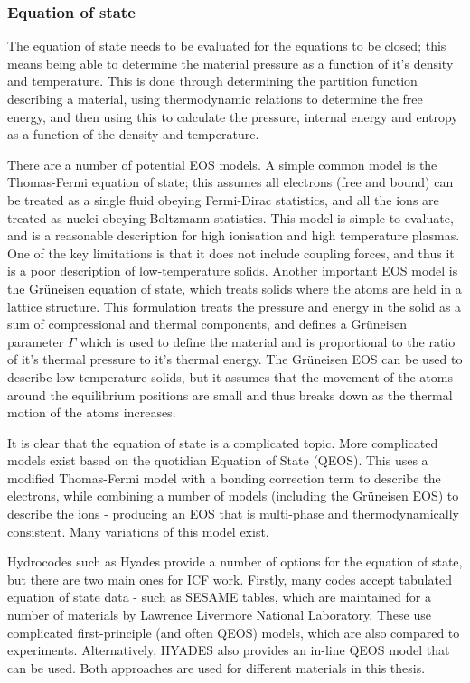 \subsubsection{Equation of state}
The equation of state needs to be evaluated for the equations to be closed; this means being able to determine the material pressure as a function of it's density and temperature. This is done through determining the partition function describing a material, using thermodynamic relations to determine the free energy, and then using this to calculate the pressure, internal energy and entropy as a function of the density and temperature.

There are a number of potential EOS models. A simple common model is the Thomas-Fermi equation of state; this assumes all electrons (free and bound) can be treated as a single fluid obeying Fermi-Dirac statistics, and all the ions are treated as nuclei obeying Boltzmann statistics. This model is simple to evaluate, and is a reasonable description for high ionisation and high temperature plasmas. One of the key limitations is that it does not include coupling forces, and thus it is a poor description of low-temperature solids. Another important EOS model is the Gr{\"u}neisen equation of state, which treats solids where the atoms are held in a lattice structure. This formulation treats the pressure and energy in the solid as a sum of compressional and thermal components, and defines a Gr{\"u}neisen parameter $\Gamma$ which is used to define the material and is proportional to the ratio of it's thermal pressure to it's thermal energy. The Gr{\"u}neisen EOS can be used to describe low-temperature solids, but it assumes that the movement of the atoms around the equilibrium positions are small and thus breaks down as the thermal motion of the atoms increases.

It is clear that the equation of state is a complicated topic. More complicated models exist based on the quotidian Equation of State (QEOS). This uses a modified Thomas-Fermi model with a bonding correction term to describe the electrons, while combining a number of models (including the Gr{\"u}neisen EOS) to describe the ions - producing an EOS that is multi-phase and thermodynamically consistent. Many variations of this model exist. 

Hydrocodes such as Hyades provide a number of options for the equation of state, but there are two main ones for ICF work. Firstly, many codes accept tabulated equation of state data - such as SESAME tables, which are maintained for a number of materials by Lawrence Livermore National Laboratory. These use complicated first-principle (and often QEOS) models, which are also compared to experiments. Alternatively, HYADES also provides an in-line QEOS model that can be used. Both approaches are used for different materials in this thesis.

